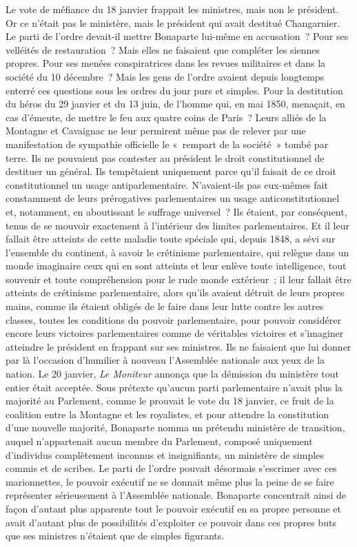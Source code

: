 \documentclass[french,twoside]{book} %
\begin{document}
Le vote de méfiance du 18 janvier frappait les ministres, mais non le président. Or ce n’était pas le ministère, mais le président qui avait destitué Changarnier. Le parti de l’ordre devait-il mettre Bonaparte lui-même en accusation ? Pour ses velléités de restauration ? Mais elles ne faisaient que compléter les siennes propres. Pour ses menées conspiratrices dans les revues militaires et dans la société du 10 décembre ? Mais les gens de l’ordre avaient depuis longtemps enterré ces questions sous les ordres du jour purs et simples. Pour la destitution du héros du 29 janvier et du 13 juin, de l’homme qui, en mai 1850, menaçait, en cas d’émeute, de mettre le feu aux quatre coins de Paris ? Leurs alliés de la Montagne et Cavaignac ne leur permirent même pas de relever par une manifestation de sympathie officielle le « rempart de la société » tombé par terre. Ils ne pouvaient pas contester au président le droit constitutionnel de destituer un général. Ils tempêtaient uniquement parce qu’il faisait de ce droit constitutionnel un usage antiparlementaire. N’avaient-ils pas eux-mêmes fait constamment de leurs prérogatives parlementaires un usage anticonstitutionnel et, notamment, en aboutissant le suffrage universel ? Ils étaient, par conséquent, tenus de se mouvoir exactement à l’intérieur des limites parlementaires. Et il leur fallait être atteints de cette maladie toute spéciale qui, depuis 1848, a sévi sur l’ensemble du continent, à savoir le crétinisme parlementaire, qui relègue dans un monde imaginaire ceux qui en sont atteints et leur enlève toute intelligence, tout souvenir et toute compréhension pour le rude monde extérieur ; il leur fallait être atteints de crétinisme parlementaire, alors qu’ils avaient détruit de leurs propres mains, comme ils étaient obligés de le faire dans leur lutte contre les autres classes, toutes les conditions du pouvoir parlementaire, pour pouvoir considérer encore leurs victoires parlementaires comme de véritables victoires et s’imaginer atteindre le président en frappant sur ses ministres. Ils ne faisaient que lui donner par là l’occasion d’humilier à nouveau l’Assemblée nationale aux yeux de la nation. Le 20 janvier, \emph{Le Moniteur} annonça que la démission du ministère tout entier était acceptée. Sous prétexte qu’aucun parti parlementaire n’avait plus la majorité au Parlement, comme le prouvait le vote du 18 janvier, ce fruit de la coalition entre la Montagne et les royalistes, et pour attendre la constitution d’une nouvelle majorité, Bonaparte nomma un prétendu ministère de transition, auquel n’appartenait aucun membre du Parlement, composé uniquement d’individus complètement inconnus et insignifiants, un ministère de simples commis et de scribes. Le parti de l’ordre pouvait désormais s’escrimer avec ces marionnettes, le pouvoir exécutif ne se donnait même plus la peine de se faire représenter sérieusement à l’Assemblée nationale. Bonaparte concentrait ainsi de façon d’autant plus apparente tout le pouvoir exécutif en sa propre personne et avait d’autant plus de possibilités d’exploiter ce pouvoir dans ces propres buts que ses ministres n’étaient que de simples figurants.\par
\end{document}
